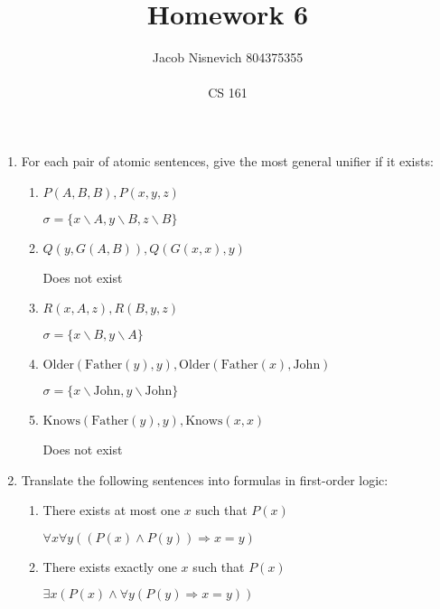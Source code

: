 \documentclass[12pt]{article}
\begin{document}
 
\title{Homework 6}
\author{Jacob Nisnevich \textemdash \hspace{2px} 804375355 \\ \\
CS 161}
 
\maketitle
 
\begin{enumerate}
	\item For each pair of atomic sentences, give the most general unifier if it exists:

		\begin{enumerate}
			\item $P(A, B, B), P(x, y, z)$

			$\sigma = \{x \backslash A, y \backslash B, z \backslash B\}$

			\item $Q(y, G(A, B)), Q(G(x, x), y)$

			Does not exist

			\item $R(x, A, z), R(B, y, z)$

			$\sigma = \{x \backslash B, y \backslash A\}$

			\item $\text{Older}(\text{Father}(y), y), \text{Older}(\text{Father}(x), \text{John})$

			$\sigma = \{x \backslash \text{John}, y \backslash \text{John}\}$

			\item $\text{Knows}(\text{Father}(y), y), \text{Knows}(x, x)$

			Does not exist
		\end{enumerate}

	\item Translate the following sentences into formulas in first-order logic:

		\begin{enumerate}
			\item There exists at most one $x$ such that $P(x)$

			$\forall x \forall y ((P(x) \land P(y)) \Rightarrow x = y)$

			\item There exists exactly one $x$ such that $P(x)$

			$\exists x (P(x) \land \forall y (P(y) \Rightarrow x = y))$


\end{enumerate}
\end{enumerate}
\end{document}

